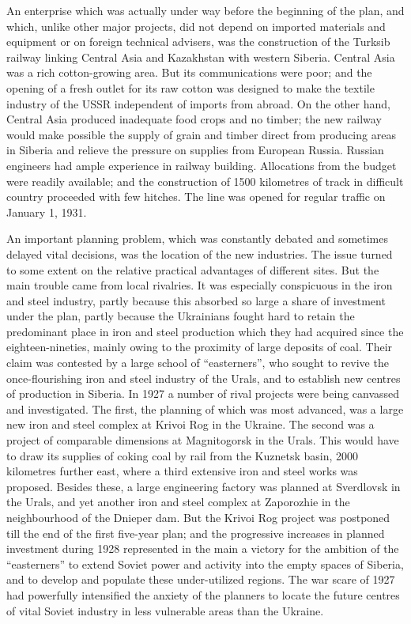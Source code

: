 An enterprise which was actually under way before the beginning of the plan, and which, unlike other major projects, did not depend on imported materials and equipment or on foreign technical advisers, was the construction of the Turksib railway linking Central Asia and Kazakhstan with western Siberia. Central Asia was a rich cotton-growing area. But its communications were poor; and the opening of a fresh outlet for its raw cotton was designed to make the textile industry of the USSR independent of imports from abroad. On the other hand, Central Asia produced inadequate food crops and no timber; the new railway would make possible the supply of grain and timber direct from producing areas in Siberia and relieve the pressure on supplies from European Russia. Russian engineers had ample experience in railway building. Allocations from the budget were readily available; and the construction of 1500 kilometres of track in difficult country proceeded with few hitches. The line was opened for regular traffic on January 1, 1931. 

An important planning problem, which was constantly debated and sometimes delayed vital decisions, was the location of the new industries. The issue turned to some extent on the relative practical advantages of different sites. But the main trouble came from local rivalries. It was especially conspicuous in the iron and steel industry, partly because this absorbed so large a share of investment under the plan, partly because the Ukrainians fought hard to retain the predominant place in iron and steel production which they had acquired since the eighteen-nineties, mainly owing to the proximity of large deposits of coal. Their claim was contested by a large school of ``easterners'', who sought to revive the once-flourishing iron and steel industry of the Urals, and to establish new centres of production in Siberia. In 1927 a number of rival projects were being canvassed and investigated. The first, the planning of which was most advanced, was a large new iron and steel complex at Krivoi Rog in the Ukraine. The second was a project of comparable dimensions at Magnitogorsk in the Urals. This would have to draw its supplies of coking coal by rail from the Kuznetsk basin, 2000 kilometres further east, where a third extensive iron and steel works was proposed. Besides these, a large engineering factory was planned at Sverdlovsk in the Urals, and yet another iron and steel complex at Zaporozhie in the neighbourhood of the Dnieper dam. But the Krivoi Rog project was postponed till the end of the first five-year plan; and the progressive increases in planned investment during 1928 represented in the main a victory for the ambition of the ``easterners'' to extend Soviet power and activity into the empty spaces of Siberia, and to develop and populate these under-utilized regions. The war scare of 1927 had powerfully intensified the anxiety of the planners to locate the future centres of vital Soviet industry in less vulnerable areas than the Ukraine. 

